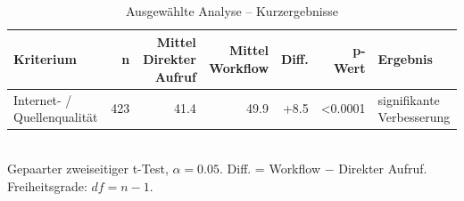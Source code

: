 \begin{table}[htbp]
\centering
\caption{Ausgewählte Analyse -- Kurzergebnisse}
\begin{tabular}{lrrrrrl}
\toprule
Kriterium & n & Mittel Direkter Aufruf & Mittel Workflow & Diff. & p-Wert & Ergebnis \\
\midrule
Internet- / Quellenqualität & 423 & 41.4 & 49.9 & +8.5 & <0.0001 & signifikante Verbesserung \\
\bottomrule
\end{tabular}
\\[2mm]
\footnotesize Gepaarter zweiseitiger t-Test, $\alpha=0.05$. Diff. = Workflow $-$ Direkter Aufruf. Freiheitsgrade: $df=n-1$.
\end{table}
